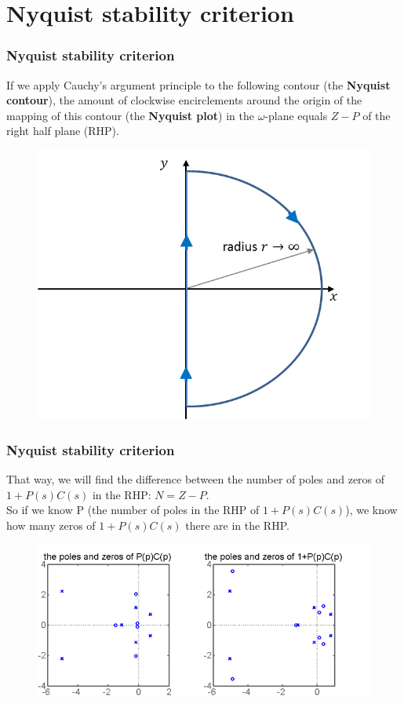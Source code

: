 \section{Nyquist stability criterion}

\begin{frame}
	\frametitle{Nyquist stability criterion}
	If we apply Cauchy's argument principle to the following contour (the \textbf{Nyquist contour}), the amount of clockwise encirclements around the origin of the mapping of this contour (the \textbf{Nyquist plot}) in the $\omega$-plane equals $Z-P$ of the right half plane (RHP).
	\vspace{-1ex}
	\begin{figure}
		\includegraphics[width=0.53\linewidth]{nyquist}
	\end{figure}
\end{frame}

\begin{frame}
	\frametitle{Nyquist stability criterion}
	That way, we will find the difference between the number of poles and zeros of $1+P(s)C(s)$ in the RHP: $N=Z-P$.\\
	\medskip
	So if we know P (the number of poles in the RHP of $1+P(s)C(s)$), we know how many zeros of $1+P(s)C(s)$ there are in the RHP.
	\begin{figure}
		\includegraphics[width=0.8\linewidth]{pz}
	\end{figure}
\end{frame}

